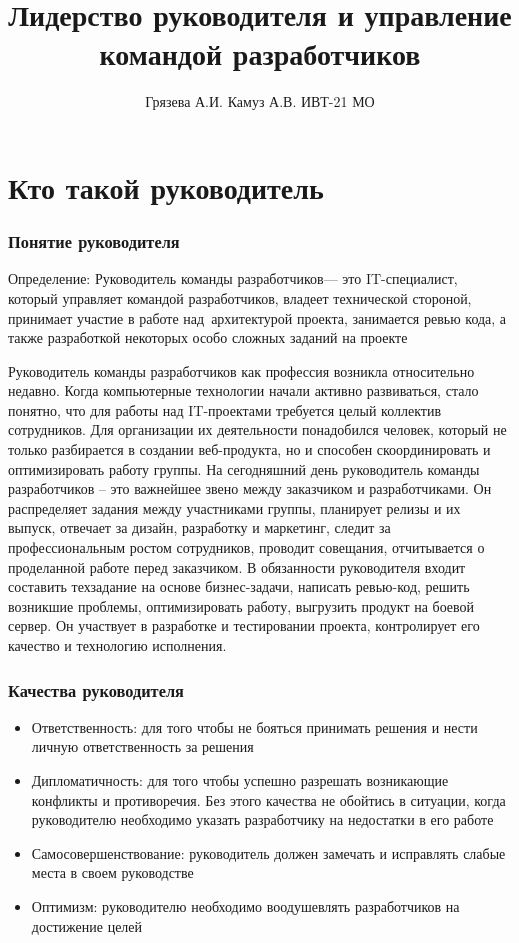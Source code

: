 \documentclass{../industrial-development}
\title{Лидерство руководителя и управление командой разработчиков}
\author{Грязева А.И. Камуз А.В. ИВТ-21 МО}
\date{}
\begin{document}
\begin{frame}
  \titlepage
\end{frame}

\section{Кто такой руководитель}


\begin{frame} \frametitle{Понятие руководителя}

\begin{block}{Определение:}
Руководитель команды разработчиков--- это IT-специалист, который \alert{управляет командой} разработчиков, владеет технической стороной, принимает участие в работе над~архитектурой проекта, занимается ревью кода, а также разработкой некоторых особо сложных заданий на проекте
\end{block}
\end{frame}
\lecturenotes Руководитель команды разработчиков как профессия возникла относительно недавно. Когда компьютерные технологии начали активно развиваться, стало понятно, что для работы над IT-проектами требуется целый коллектив сотрудников. Для организации их деятельности понадобился человек, который не только разбирается в создании веб-продукта, но и способен скоординировать и оптимизировать работу группы. На сегодняшний день руководитель команды разработчиков – это важнейшее звено между заказчиком и разработчиками.
Он распределяет задания между участниками группы, планирует релизы и их выпуск, отвечает за дизайн, разработку и маркетинг, следит за профессиональным ростом сотрудников, проводит совещания, отчитывается о проделанной работе перед заказчиком. 
В обязанности руководителя входит составить техзадание на основе бизнес-задачи, написать ревью-код, решить возникшие проблемы, оптимизировать работу, выгрузить продукт на боевой сервер. Он участвует в разработке и тестировании проекта, контролирует его качество и технологию исполнения.





\begin{frame} \frametitle{Качества руководителя}

  \begin{itemize}
  \item Ответственность: для того чтобы не бояться принимать решения и нести личную ответственность за решения 
  \item Дипломатичность: для того чтобы успешно разрешать возникающие конфликты и противоречия. Без этого качества не обойтись в ситуации, когда руководителю необходимо указать разработчику на недостатки в его работе
  \item Самосовершенствование: руководитель должен замечать и исправлять слабые места в своем руководстве
  \item Оптимизм: руководителю необходимо воодушевлять разработчиков на достижение целей
    \end{itemize}
  \end{frame}
\end{document}
